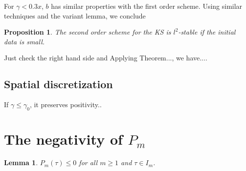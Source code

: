 \documentclass[11pt]{article}
\newtheorem{lmm}{Lemma}
\newtheorem{pro}{Proposition}
\begin{document}
For $\gamma<0.3x$, $b$ has similar properties with the first order scheme. Using similar techniques and the variant lemma, we conclude
\begin{pro}
The second order scheme for the KS is $l^2$-stable if the initial data is small.
\end{pro}

Just check the right hand side and Applying Theorem..., we have....

\subsection{Spatial discretization}
If $\gamma\le \gamma_0$, it preserves positivity..

\appendix

\section{The negativity of $P_m$}
\begin{lmm}
$P_m(\tau)\le 0$ for all $m\ge 1$ and $\tau\in I_m$.
\end{lmm}
\end{document}
